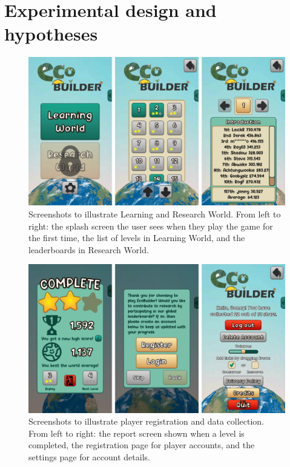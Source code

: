 \section{Experimental design and hypotheses}
\label{sec:eco_hypotheses}
\begin{figure}
    \centering
    \includegraphics[width=\textwidth]{joy/worlds.png}
    \caption[Learning World and Research World]{Screenshots to illustrate Learning and Research World. From left to right: the splash screen the user sees when they play the game for the first time, the list of levels in Learning World, and the leaderboards in Research World.}
    \label{fig:eco_worlds}
\end{figure}

\begin{figure}
    \centering
    \includegraphics[width=\textwidth]{joy/server.png}
    \caption[Player registration and data collection]{Screenshots to illustrate player registration and data collection. From left to right: the report screen shown when a level is completed, the registration page for player accounts, and the settings page for account details.}
    \label{fig:eco_server}
\end{figure}

